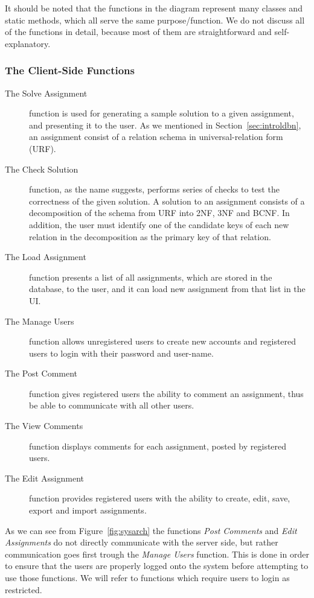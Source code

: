 It should be noted that the functions in the diagram represent many classes and 
static methods, which all serve the same purpose/function. We do not 
discuss all 
of the functions in detail, because most of them are straightforward and 
self-explanatory. 

\subsubsection{The Client-Side Functions}

\begin{description}
	\item[The Solve Assignment] function is used for generating a sample solution to 
		a given assignment, and presenting it to the user. As we mentioned in 
		Section~\ref{sec:introldbn}, an assignment consist of a relation schema in universal-relation form (URF).
	\item[The Check Solution] function, as the name suggests, performs series of checks to 
		test the correctness of the given solution. A solution to an assignment consists 
		of a decomposition of the schema from URF into 2NF, 3NF and BCNF. In addition,
		the user must identify one of the candidate keys of each new relation
    in the decomposition as the primary key of that relation.
	\item[The Load Assignment] function presents a list of all assignments, which are 
		stored in the database, to the user, and it can load new assignment from that list
		in the UI.
	\item[The Manage Users] function allows unregistered users to create new accounts 
		and registered users to login with their password and user-name. 
	\item[The Post Comment] function gives registered users the ability to comment an assignment, 
		thus be able to communicate with all other users.
	\item[The View Comments] function displays comments for each assignment, posted by registered users.
	\item[The Edit Assignment] function provides registered users with the 
		ability to create, edit, save, export and import assignments. 
\end{description}

As we can see from Figure~\ref{fig:sysarch} the functions \textit{Post Comments} 
and \textit{Edit Assignments} do not directly communicate with the server side, but rather 
communication goes first trough the \textit{Manage Users} function. This is done in order 
to ensure that the users are properly logged onto the system before attempting 
to use those functions. We will refer to functions which require users to login as restricted. 


